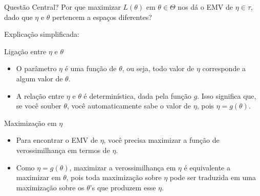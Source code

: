 \documentclass[12pt]{beamer}
\begin{document}
\begin{frame}{}%
	\begin{block}{Questão Central?}
		Por que maximizar \( L(\theta) \) em \( \theta \in \Theta \) nos dá o EMV de \( \eta \in \tau \), dado que \( \eta \) e \( \theta \) pertencem a espaços diferentes?
	\end{block}
\end{frame}

\begin{frame}{Explicação simplificada:}
	\begin{block}{Ligação entre \( \eta \) e \( \theta \)}
		\begin{itemize}
			\justifying
			\item O parâmetro \( \eta \) é uma função de \( \theta \), ou seja, todo valor de \( \eta \) corresponde a algum valor de \( \theta \).
			\item A relação entre \( \eta \) e \( \theta \) é determinística, dada pela função \( g \). Isso significa que, se você souber \( \theta \), você automaticamente sabe o valor de \( \eta \), pois \( \eta = g(\theta) \).
			
		\end{itemize}
	\end{block}
	\pause
	\begin{block}{Maximização em \( \eta \)}
		\begin{itemize}
			\justifying
			\item Para encontrar o EMV de \( \eta \), você precisa maximizar a função de verossimilhança em termos de \( \eta \).
			\item Como \( \eta = g(\theta) \), maximizar a verossimilhança em \( \eta \) é equivalente a maximizar em \( \theta \), pois toda maximização sobre \( \eta \) pode ser traduzida em uma maximização sobre os \( \theta \)'s que produzem esse \( \eta \).
		\end{itemize}
	\end{block}
\end{frame}
\end{document}
